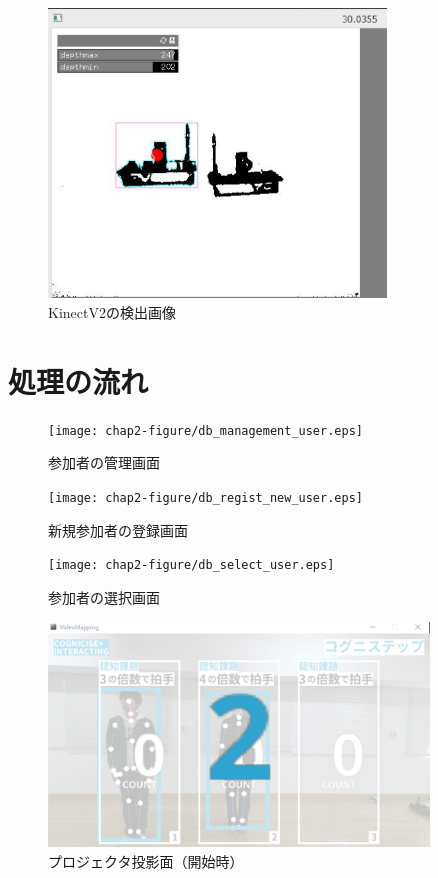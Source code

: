 \begin{figure}[tbp]
	\centering
			\includegraphics[width=0.8\textwidth]{chap2-figure/kinectsystem.eps}
	\caption{KinectV2の検出画像}
	\label{fig:kinectsystemarc}
\end{figure}
\fi

\section{処理の流れ}

\begin{figure}[tbp]
	\centering
			\texttt{[image: chap2-figure/db\_management\_user.eps]}
	\caption{参加者の管理画面}
	\label{fig:db_management_user}
\end{figure}

\begin{figure}[tbp]
	\centering
			\texttt{[image: chap2-figure/db\_regist\_new\_user.eps]}
	\caption{新規参加者の登録画面}
	\label{fig:db_regist_new_user}
\end{figure}

\begin{figure}[tbp]
	\centering
			\texttt{[image: chap2-figure/db\_select\_user.eps]}
	\caption{参加者の選択画面}
	\label{fig:db_select_user}
\end{figure}

\begin{figure}[tbp]
	\centering
			\includegraphics[width=0.9\textwidth]{chap2-figure/vm_start.eps}
	\caption{プロジェクタ投影面（開始時）}
	\label{fig:vm_start}
\end{figure}

